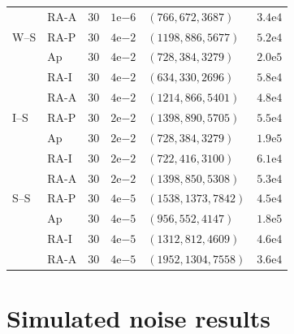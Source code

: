 \documentclass[
  reprint,
  amsmath,
  amssymb,
  aps,
  pra,
  nofootinbib,
  superscriptaddress,
  floatfix
]{revtex4-2}
\begin{document}
\begin{table}[t]
\begin{tabular}{@{}llrrlr@{}}
     & RA-A & 30 & \(1\mathrm{e}{-6}\) & \((766,672,3687)\) & \(3.4\mathrm{e}4\) \\
\addlinespace[0.35ex]
W--S & RA-P & 30 & \(4\mathrm{e}{-2}\) & \((1198,886,5677)\) & \(5.2\mathrm{e}4\) \\
     & Ap   & 30 & \(4\mathrm{e}{-2}\) & \((728,384,3279)\) & \(2.0\mathrm{e}5\) \\
     & RA-I & 30 & \(4\mathrm{e}{-2}\) & \((634,330,2696)\) & \(5.8\mathrm{e}4\) \\
     & RA-A & 30 & \(4\mathrm{e}{-2}\) & \((1214,866,5401)\) & \(4.8\mathrm{e}4\) \\
\addlinespace[0.35ex]
I--S & RA-P & 30 & \(2\mathrm{e}{-2}\) & \((1398,890,5705)\) & \(5.5\mathrm{e}4\) \\
     & Ap   & 30 & \(2\mathrm{e}{-2}\) & \((728,384,3279)\) & \(1.9\mathrm{e}5\) \\
     & RA-I & 30 & \(2\mathrm{e}{-2}\) & \((722,416,3100)\) & \(6.1\mathrm{e}4\) \\
     & RA-A & 30 & \(2\mathrm{e}{-2}\) & \((1398,850,5308)\) & \(5.3\mathrm{e}4\) \\
\addlinespace[0.35ex]
S--S & RA-P & 30 & \(4\mathrm{e}{-5}\) & \((1538,1373,7842)\) & \(4.5\mathrm{e}4\) \\
     & Ap   & 30 & \(4\mathrm{e}{-5}\) & \((956,552,4147)\) & \(1.8\mathrm{e}5\) \\
     & RA-I & 30 & \(4\mathrm{e}{-5}\) & \((1312,812,4609)\) & \(4.6\mathrm{e}4\) \\
     & RA-A & 30 & \(4\mathrm{e}{-5}\) & \((1952,1304,7558)\) & \(3.6\mathrm{e}4\) \\
\bottomrule
\end{tabular}
\end{table}

\section{Simulated noise results}
\label{app:noise_selection_robustness}
\label{app:finite_shot_score_robustness}

\end{document}
